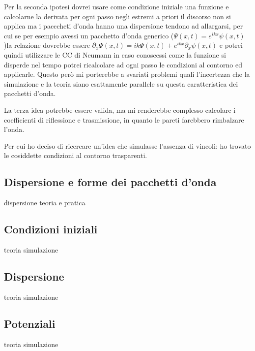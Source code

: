 Per la seconda ipotesi dovrei usare come condizione iniziale una funzione e calcolarne la derivata per ogni passo negli estremi a priori il discorso non si applica ma i pacccheti d'onda hanno una dispersione tendono ad allargarsi, per cui se  per esempio avessi un pacchetto d'onda generico ($\Psi(x,t) = e^{ikx} \psi(x,t)$)la relazione dovrebbe essere $\partial_x \Psi(x,t) = ik \Psi(x,t) + e^{ikx}\partial_x\psi(x,t)$ e potrei quindi utilizzare le CC di Neumann in caso conoscessi come la funzione si disperde nel tempo potrei ricalcolare ad ogni passo le condizioni al contorno ed applicarle. Questo per\`o mi porterebbe a svariati problemi quali l'incertezza che la simulazione e la teoria siano esattamente parallele su questa caratteristica dei pacchetti d'onda.

La terza idea potrebbe essere valida, ma mi renderebbe complesso calcolare i coefficienti di riflessione e trasmissione, in quanto le pareti farebbero rimbalzare l'onda.

Per cui ho deciso di ricercare un'idea che simulasse l'assenza di vincoli: ho trovato le cosiddette condizioni al contorno trasparenti.
\subsection{Dispersione e forme dei pacchetti d'onda}
dispersione teoria e pratica
\subsection{Condizioni iniziali}
teoria
simulazione
\subsection{Dispersione}
teoria
simulazione
\subsection{Potenziali}
teoria
simulazione